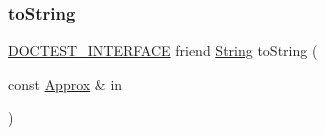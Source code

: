 \subsubsection{\texorpdfstring{to\+String}{toString}}
{\footnotesize\ttfamily \hyperlink{doctest_8h_a9c16ffc635ec47f07797d21ede26b1a5}{D\+O\+C\+T\+E\+S\+T\+\_\+\+I\+N\+T\+E\+R\+F\+A\+CE} friend \hyperlink{classdoctest_1_1_string}{String} to\+String (\begin{DoxyParamCaption}\item[{const \hyperlink{classdoctest_1_1_approx}{Approx} \&}]{in }\end{DoxyParamCaption})\hspace{0.3cm}{\ttfamily [friend]}}

